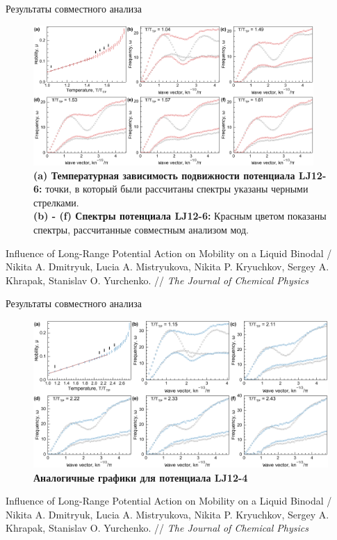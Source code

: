 \documentclass{beamer}
\begin{document}
\begin{frame}{Результаты совместного анализа}
\scriptsize{

\begin{figure}
\centering
 \includegraphics[width=0.95\textwidth]{MACR-Figure4}
 \caption{\scriptsize{\textbf{(a) Температурная зависимость подвижности потенциала LJ12-6:} точки, в который были рассчитаны спектры указаны черными стрелками.\\
 \textbf{(b) - (f) Спектры потенциала LJ12-6:} Красным цветом показаны спектры, рассчитанные совместным анализом мод.}}
\label{Figure4}
\end{figure}

}

\tiny{Influence of Long-Range Potential Action on Mobility on a Liquid Binodal / Nikita A. Dmitryuk, Lucia A. Mistryukova, Nikita P. Kryuchkov, Sergey A. Khrapak, Stanislav O. Yurchenko. // \textit{The Journal of Chemical Physics}}

\end{frame}








\begin{frame}{Результаты совместного анализа}
\footnotesize{

\begin{figure}
\centering
\includegraphics[width=\textwidth]{MACR-Figure5}
\caption{\footnotesize \textbf{Аналогичные графики для потенциала LJ12-4}}
\label{Figure4}
\end{figure}

}

\tiny{Influence of Long-Range Potential Action on Mobility on a Liquid Binodal / Nikita A. Dmitryuk, Lucia A. Mistryukova, Nikita P. Kryuchkov, Sergey A. Khrapak, Stanislav O. Yurchenko. // \textit{The Journal of Chemical Physics}}
\end{frame}
\end{document}
